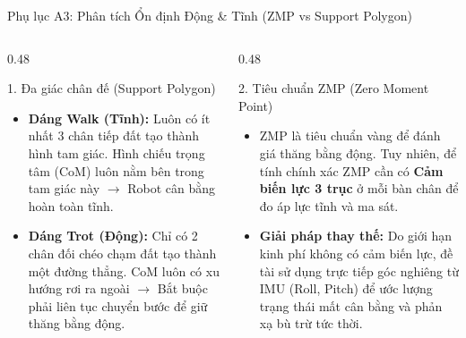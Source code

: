 \documentclass[10pt,aspectratio=169]{beamer}
\begin{document}
\begin{frame}{Phụ lục A3: Phân tích Ổn định Động \& Tĩnh (ZMP vs Support Polygon)}
  \begin{columns}[t]
      \begin{column}{0.48\textwidth}
          \begin{block}{1. Đa giác chân đế (Support Polygon)}
              \begin{itemize}
                  \item \textbf{Dáng Walk (Tĩnh):} Luôn có ít nhất 3 chân tiếp đất tạo thành hình tam giác. Hình chiếu trọng tâm (CoM) luôn nằm bên trong tam giác này $\rightarrow$ Robot cân bằng hoàn toàn tĩnh.
                  \item \textbf{Dáng Trot (Động):} Chỉ có 2 chân đối chéo chạm đất tạo thành một đường thẳng. CoM luôn có xu hướng rơi ra ngoài $\rightarrow$ Bắt buộc phải liên tục chuyển bước để giữ thăng bằng động.
              \end{itemize}
          \end{block}
      \end{column}
      \begin{column}{0.48\textwidth}
          \begin{block}{2. Tiêu chuẩn ZMP (Zero Moment Point)}
              \begin{itemize}
                  \item ZMP là tiêu chuẩn vàng để đánh giá thăng bằng động. Tuy nhiên, để tính chính xác ZMP cần có \textbf{Cảm biến lực 3 trục} ở mỗi bàn chân để đo áp lực tĩnh và ma sát.
                  \item \textbf{Giải pháp thay thế:} Do giới hạn kinh phí không có cảm biến lực, đề tài sử dụng trực tiếp góc nghiêng từ IMU (Roll, Pitch) để ước lượng trạng thái mất cân bằng và phản xạ bù trừ tức thời.
              \end{itemize}
          \end{block}
      \end{column}
  \end{columns}
\end{frame}
\end{document}
